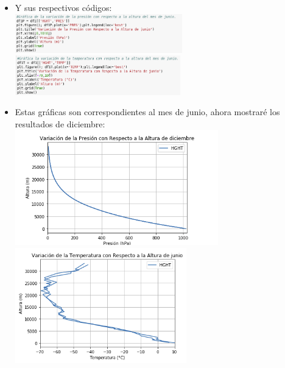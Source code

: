 \documentclass{article}
\begin{document}
\begin{doublespace}
\begin{itemize}
\item Y sus respectivos códigos: 
\\
\includegraphics[height=1.7cm]{act34.png}  \hspace*{\fill}
    \includegraphics[height=1.7cm]{act36.png}
    
\item Estas gráficas son correspondientes al mes de junio, ahora mostraré los resultados de diciembre:
\\
	\includegraphics[height=5cm]{act39.png}  \hspace*{\fill}
    \includegraphics[height=5cm]{act311.png}


\end{itemize}
\end{doublespace}
\end{document}
